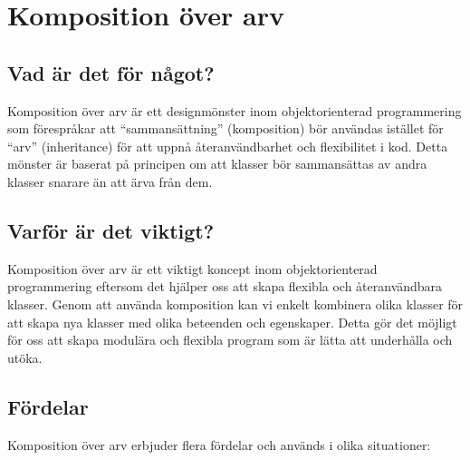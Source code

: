 \hypertarget{komposition-uxf6ver-arv}{%
\section{Komposition över arv}\label{komposition-uxf6ver-arv}}

\hypertarget{vad-uxe4r-det-fuxf6r-nuxe5got}{%
\subsection{Vad är det för något?}\label{vad-uxe4r-det-fuxf6r-nuxe5got}}

Komposition över arv är ett designmönster inom objektorienterad
programmering som förespråkar att ``sammansättning'' (komposition) bör
användas istället för ``arv'' (inheritance) för att uppnå
återanvändbarhet och flexibilitet i kod. Detta mönster är baserat på
principen om att klasser bör sammansättas av andra klasser snarare än
att ärva från dem.

\hypertarget{varfuxf6r-uxe4r-det-viktigt}{%
\subsection{Varför är det viktigt?}\label{varfuxf6r-uxe4r-det-viktigt}}

Komposition över arv är ett viktigt koncept inom objektorienterad
programmering eftersom det hjälper oss att skapa flexibla och
återanvändbara klasser. Genom att använda komposition kan vi enkelt
kombinera olika klasser för att skapa nya klasser med olika beteenden
och egenskaper. Detta gör det möjligt för oss att skapa modulära och
flexibla program som är lätta att underhålla och utöka.

\hypertarget{fuxf6rdelar}{%
\subsection{Fördelar}\label{fuxf6rdelar}}

Komposition över arv erbjuder flera fördelar och används i olika
situationer:

